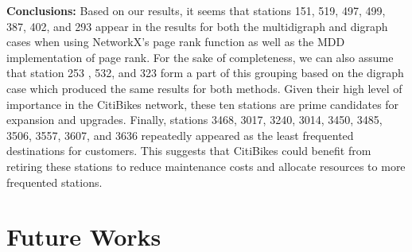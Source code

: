 \documentclass{article}
\begin{document}
\newline
 \textbf{Conclusions:}
 \newline
	Based on our results, it seems that stations 151, 519, 497, 499, 387, 402, and 293 appear in the results for both the multidigraph and digraph cases when using NetworkX’s page rank function as well as the MDD implementation of page rank. For the sake of completeness, we can also assume that station 253 , 532, and 323 form a part of this grouping based on the digraph case which produced the same results for both methods. Given their high level of importance in the CitiBikes network, these ten stations are prime candidates for expansion and upgrades. 
 \newline
Finally, stations 3468, 3017, 3240, 3014, 3450, 3485, 3506, 3557, 3607, and 3636 repeatedly appeared as the least frequented destinations for customers. This suggests that CitiBikes could benefit from retiring these stations to reduce maintenance costs and allocate resources to more frequented stations. 

\section{Future Works}
\end{document}
